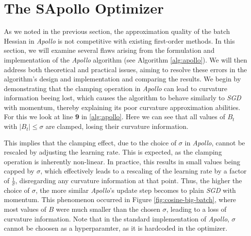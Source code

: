  
\section{The SApollo Optimizer}
As we noted in the previous section, the approximation quality of the batch Hessian in \emph{Apollo} is not competitive with existing first-order methods.
In this section, we will examine several flaws arising from the formulation and implementation of the \emph{Apollo} algorithm (see Algorithm \ref{alg:apollo}).
We will then address both theoretical and practical issues, aiming to resolve these errors in the algorithm's design and implementation and comparing
the results.
We begin by demonstrating that the clamping operation in \emph{Apollo} can lead to curvature information beeing lost,
which causes the algorithm to behave similarly to \emph{SGD} with momentum, thereby explaining its poor curvature approximation abilities.\\
For this we look at line \textbf{9} in \ref{alg:apollo}. Here we can see that all values of $B_t$ with $|B_t| \le \sigma$ are clamped,
losing their curvature information. 

This implies that the clamping effect, due to the choice of $\sigma$ in \emph{Apollo}, cannot be rescaled by adjusting the learning rate. 
This is expected, as the clamping operation is inherently non-linear.
In practice, this results in small values being capped by $\sigma$, which effectively leads to a rescaling of the learning rate by a 
factor of $\frac{1}{\sigma}$, disregarding any curvature information at that point. Thus, the higher the choice of $\sigma$,
the more similar \emph{Apollo}'s update step becomes to plain \emph{SGD} with momentum.
This phenomenon occurred in Figure \ref{fig:cosine-big-batch}, where most values of $B$ were much smaller than the chosen $\sigma$,
leading to a loss of curvature information.
Note that in the standard implementation of \emph{Apollo}, $\sigma$ cannot be choosen as a hyperparamter, as it is hardcoded in the optimizer.

